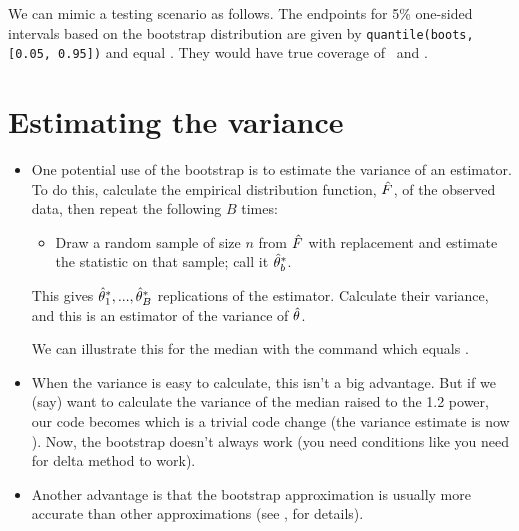 \begin{itemize}[leftmargin=0pt]
  \renewcommand*\FancyVerbStartString{## block 1}

  We can mimic a testing scenario as follows.
  \renewcommand*\FancyVerbStartString{## block 3}
  The endpoints for 5\% one-sided intervals based on the bootstrap
  distribution are given by \verb|quantile(boots, [0.05, 0.95])| and
  equal \bootquantiles.  They would have true coverage of \bootleft\
  and \bootright.

\end{itemize}

\section{Estimating the variance}

\begin{itemize}[leftmargin=0pt]

\item One potential use of the bootstrap is to estimate the variance
  of an estimator.  To do this, calculate the empirical distribution
  function, $\hat{F}$, of the observed data, then repeat the following $B$
  times:
  \begin{itemize}
  \item Draw a random sample of size $n$ from $\hat{F}$ with replacement
    and estimate the statistic on that sample; call it $\hat{\theta}^*_b$.
  \end{itemize}
  This gives $\hat{\theta}^*_1,...,\hat{\theta}^*_B$ replications of the estimator.
  Calculate their variance, and this is an estimator of the variance
  of $\hat{\theta}$.

  We can illustrate this for the median with the command
  \renewcommand*\FancyVerbStartString{## block 4}
  which equals \medv.

\item When the variance is easy to calculate, this isn't a big
  advantage.  But if we (say) want to calculate the variance of the
  median raised to the 1.2 power, our code becomes
  \renewcommand*\FancyVerbStartString{## block 5}
  which is a trivial code change (the variance estimate is now \powv).
  Now, the bootstrap doesn't always work (you need conditions like you
  need for delta method to work).

\item Another advantage is that the bootstrap approximation is usually
  more accurate than other approximations (see \citealp{Hal91}, for
  details).

\end{itemize}


